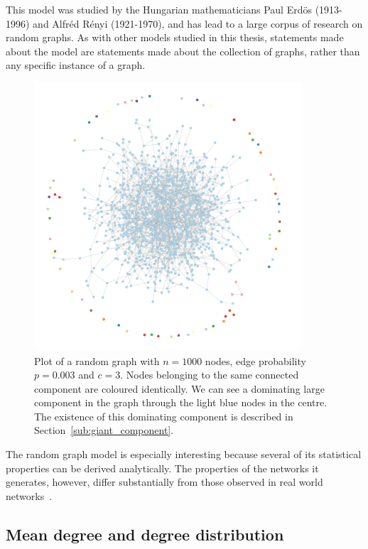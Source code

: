This model was studied by the Hungarian mathematicians Paul Erd\"os (1913-1996) and Alfr\'ed R\'enyi (1921-1970), and has lead to a large corpus of research on random graphs.
As with other models studied in this thesis, statements made about the model are statements made about the collection of graphs, rather than any specific instance of a graph.

\begin{figure}[tb]
	\centering
	\includegraphics[width=10cm]{figures/gnp_hairball.png}
	\caption[Plot of a random graph with a dominating giant component]{Plot of a random graph with $n = 1000$ nodes, edge probability $p = 0.003$ and $c=3$. 
	Nodes belonging to the same connected component are coloured identically.
	We can see a dominating large component in the graph through the light blue nodes in the centre.
	The existence of this dominating component is described in Section~\ref{sub:giant_component}.}
	\label{fig:hairball}
\end{figure}

The random graph model is especially interesting because several of its statistical properties can be derived analytically.
The properties of the networks it generates, however, differ substantially from those observed in real world networks~\cite{Albert:2002p4071}.

\subsection{Mean degree and degree distribution} %
\label{ssub:mean_degree_and_degree_distribution}

